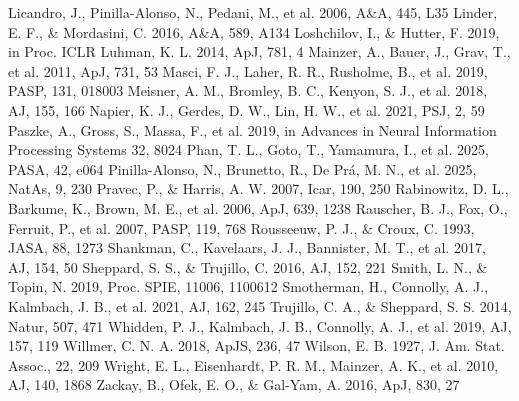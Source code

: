 \documentclass[twocolumn,linenumbers,anonymous]{aastex702}
\begin{document}
\begin{thebibliography}{}
 Licandro, J., Pinilla-Alonso, N., Pedani, M., et al. 2006, A\&A, 445, L35
 Linder, E. F., \& Mordasini, C. 2016, A\&A, 589, A134
 Loshchilov, I., \& Hutter, F. 2019, in Proc. ICLR
 Luhman, K. L. 2014, ApJ, 781, 4
 Mainzer, A., Bauer, J., Grav, T., et al. 2011, ApJ, 731, 53
 Masci, F. J., Laher, R. R., Rusholme, B., et al. 2019, PASP, 131, 018003
 Meisner, A. M., Bromley, B. C., Kenyon, S. J., et al. 2018, AJ, 155, 166
 Napier, K. J., Gerdes, D. W., Lin, H. W., et al. 2021, PSJ, 2, 59
 Paszke, A., Gross, S., Massa, F., et al. 2019, in Advances in Neural Information Processing Systems 32, 8024
 Phan, T. L., Goto, T., Yamamura, I., et al. 2025, PASA, 42, e064
 Pinilla-Alonso, N., Brunetto, R., De Pr{\'a}, M. N., et al. 2025, NatAs, 9, 230
 Pravec, P., \& Harris, A. W. 2007, Icar, 190, 250
 Rabinowitz, D. L., Barkume, K., Brown, M. E., et al. 2006, ApJ, 639, 1238
 Rauscher, B. J., Fox, O., Ferruit, P., et al. 2007, PASP, 119, 768
 Rousseeuw, P. J., \& Croux, C. 1993, JASA, 88, 1273
 Shankman, C., Kavelaars, J. J., Bannister, M. T., et al. 2017, AJ, 154, 50
 Sheppard, S. S., \& Trujillo, C. 2016, AJ, 152, 221
 Smith, L. N., \& Topin, N. 2019, Proc. SPIE, 11006, 1100612
 Smotherman, H., Connolly, A. J., Kalmbach, J. B., et al. 2021, AJ, 162, 245
 Trujillo, C. A., \& Sheppard, S. S. 2014, Natur, 507, 471
 Whidden, P. J., Kalmbach, J. B., Connolly, A. J., et al. 2019, AJ, 157, 119
 Willmer, C. N. A. 2018, ApJS, 236, 47
 Wilson, E. B. 1927, J. Am. Stat. Assoc., 22, 209
 Wright, E. L., Eisenhardt, P. R. M., Mainzer, A. K., et al. 2010, AJ, 140, 1868
 Zackay, B., Ofek, E. O., \& Gal-Yam, A. 2016, ApJ, 830, 27
\end{thebibliography}
\end{document}
